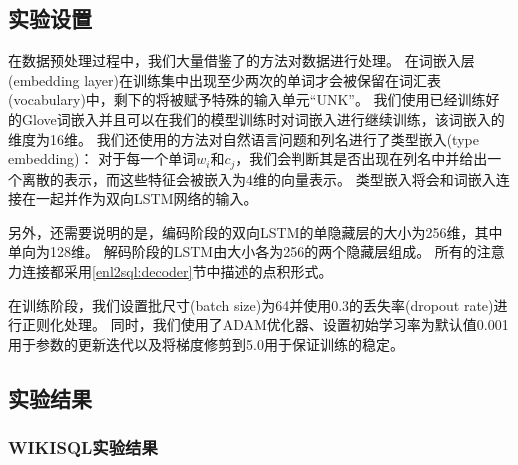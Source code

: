 \subsection{实验设置}
在数据预处理过程中，我们大量借鉴了\cite{dong2018coarse}的方法对数据进行处理。
在词嵌入层(embedding layer)在训练集中出现至少两次的单词才会被保留在词汇表(vocabulary)中，剩下的将被赋予特殊的输入单元“UNK”。
我们使用已经训练好的Glove词嵌入\cite{pennington2014glove}并且可以在我们的模型训练时对词嵌入进行继续训练，该词嵌入的维度为16维。
我们还使用\cite{yu2018typesql}的方法对自然语言问题和列名进行了类型嵌入(type embedding)：
对于每一个单词$w_i$和$c_j$，我们会判断其是否出现在列名中并给出一个离散的表示，而这些特征会被嵌入为4维的向量表示。
类型嵌入将会和词嵌入连接在一起并作为双向LSTM网络的输入。

另外，还需要说明的是，编码阶段的双向LSTM的单隐藏层的大小为256维，其中单向为128维。
解码阶段的LSTM由大小各为256的两个隐藏层组成。
所有的注意力连接都采用\ref{enl2sql:decoder}节中描述的点积形式。

在训练阶段，我们设置批尺寸(batch size)为64并使用0.3的丢失率(dropout rate)进行正则化处理。
同时，我们使用了ADAM优化器\cite{kingma2014adam}、设置初始学习率为默认值0.001用于参数的更新迭代以及将梯度修剪到5.0用于保证训练的稳定。


\subsection{实验结果}
\subsubsection{WIKISQL实验结果}

